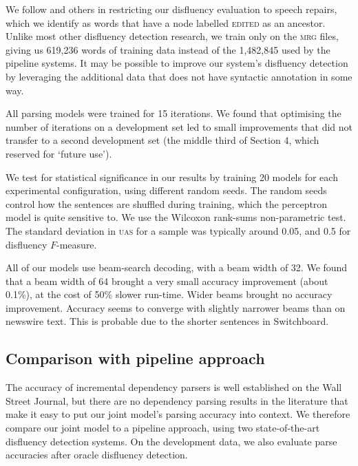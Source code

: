 \documentclass[11pt,letterpaper]{article}
\begin{document}
We follow \citet{Johnson04a} and others in restricting our disfluency evaluation
to speech repairs, which we identify as words that have a node labelled \textsc{edited}
as an ancestor.  Unlike most other disfluency detection research, we train only
on the \textsc{mrg} files, giving us 619,236 words of training data instead of
the 1,482,845 used by the pipeline systems.  It may be possible to improve our
system's disfluency detection by leveraging the additional data that does not
have syntactic annotation in some way.

All parsing models were trained for 15 iterations.
We found that optimising the number of iterations on a development set led to
small improvements that did not transfer to a second development set (the middle
third of Section 4, which \citet{Charniak01a} reserved for `future use').

We test for statistical significance in our results by training 20 models for
each experimental configuration, using different random seeds. The random seeds
control how the sentences are shuffled during training, which the perceptron
model is quite sensitive to.  We use the Wilcoxon rank-sums non-parametric test.
The standard deviation in \textsc{uas} for a sample was typically around 0.05,
and 0.5 for disfluency $F$-measure.

All of our models use beam-search decoding, with a beam width of 32. We found that
a beam width of 64 brought a very small accuracy improvement (about 0.1\%), at
the cost of 50\% slower run-time. Wider beams brought no accuracy improvement.
Accuracy seems to converge with slightly narrower beams than on newswire text.
This is probable due to the shorter sentences in Switchboard.


\subsection{Comparison with pipeline approach}
\label{sec:pipeline}
The accuracy of incremental dependency parsers is well established on the Wall
Street Journal, but there are no dependency parsing results in the literature
that make it easy to put our joint model's parsing accuracy into context.
We therefore compare our joint model to a pipeline approach, using two state-of-the-art
disfluency detection systems. On the development data, we also evaluate parse
accuracies after oracle disfluency detection.
\end{document}
